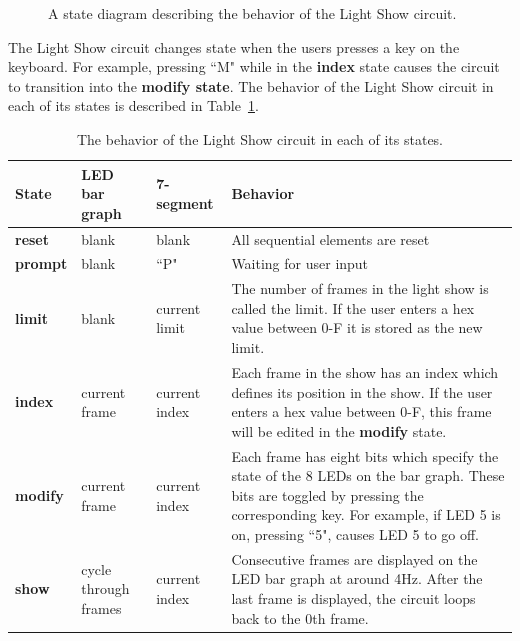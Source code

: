 \begin{figure}[ht]
\caption{A state diagram describing the behavior of the Light Show circuit.}
\label{fig:LSbehavior}
\end{figure}

The Light Show circuit changes state when the users presses a key on 
the keyboard. For example, pressing ``M" while in the {\bf index } state causes 
the circuit to transition into the {\bf modify state}. The behavior of the 
Light Show circuit in each of its states is described in 
Table~\ref{table:LSbehavior}.

\begin{table}
\begin{tabular}{l|l|l|p{2.0in}}
{\bf State }	& LED bar graph	& 7-segment	& Behavior 				\\ \hline \hline
{\bf reset }	& blank		& blank		& All sequential elements are reset 	\\ \hline
{\bf prompt }	& blank		& ``P"		& Waiting for user input		\\ \hline
{\bf limit }	& blank		& current limit	& The number of frames in the light show is called 
	the limit. If the user enters a hex value between 0-F it is stored as the new limit. \\  \hline
{\bf index }	& current frame	& current index	& Each frame in the show has an index which defines 
	its position in the show. If the user enters a hex value between 0-F, this frame will 
	be edited in the {\bf modify } state. 						\\ \hline
{\bf modify }	& current frame	& current index	& Each frame has eight bits which specify the state of 
	the 8 LEDs on the bar graph.  These bits are toggled by pressing the corresponding 
	key. For example, if LED 5 is on, pressing ``5", causes LED 5 
	to go off.								\\ \hline
{\bf show }	& cycle through frames & current index & Consecutive frames are displayed on the 
	LED bar graph at around 4Hz. After the last frame is displayed, the circuit loops 
	back to the 0th frame. 							\\ 
\end{tabular}
\caption{The behavior of the Light Show circuit in each of its states.}
\label{table:LSbehavior}
\end{table}

